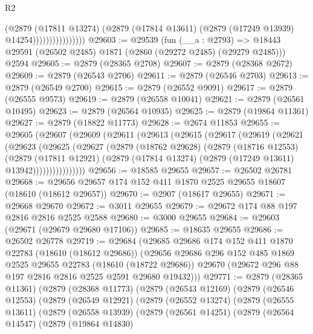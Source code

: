 \begin{lexlean}{R2}
\begin{coremodule}
                              (@2879
                                (@17811 @13274)
                                (@2879 (@17814 @13611) (@2879 (@17249 @13939) @14254))))))))))))))))
@29603 := @29539
    (fun (__a : @2793) => @18443 @29591 (@26502 @2485) @1871 (@2860 (@29272 @2485) (@29279 @2485)))
    @2594
@29605 := @2879 (@28365 @2708)
@29607 := @2879 (@28368 @2672)
@29609 := @2879 (@26543 @2706)
@29611 := @2879 (@26546 @2703)
@29613 := @2879 (@26549 @2700)
@29615 := @2879 (@26552 @9091)
@29617 := @2879 (@26555 @9573)
@29619 := @2879 (@26558 @10041)
@29621 := @2879 (@26561 @10495)
@29623 := @2879 (@26564 @10935)
@29625 := @2879 (@19864 @11361)
@29627 := @2879 (@18822 @11773)
@29628 := @2674 @11853
@29655 := @29605
    (@29607
      (@29609
        (@29611
          (@29613
            (@29615
              (@29617
                (@29619
                  (@29621
                    (@29623
                      (@29625
                        (@29627
                          (@2879
                            (@18762 @29628)
                            (@2879
                              (@18716 @12553)
                              (@2879
                                (@17811 @12921)
                                (@2879 (@17814 @13274) (@2879 (@17249 @13611) @13942))))))))))))))))
@29656 := @18585 @29655
@29657 := @26502 @26781
@29668 := @29656 @29657 @174 @152 @411 @1870 @2525 @29655 @18607 (@18610 (@18612 @29657))
@29670 := @2907 (@18617 @29655)
@29671 := @29668 @29670
@29672 := @3011 @29655
@29679 := @29672 @174 @88 @197 @2816 @2816 @2525 @2588
@29680 := @3000 @29655
@29684 := @29603 (@29671 (@29679 @29680 @17106))
@29685 := @18635 @29655
@29686 := @26502 @26778
@29719 := @29684
    (@29685
      @29686
      @174
      @152
      @411
      @1870
      @22783
      (@18610 (@18612 @29686))
      (@29656
        @29686
        @296
        @152
        @485
        @1869
        @2525
        @29655
        @22783
        (@18610 (@18722 @29686))
        @29670
        (@29672 @296 @88 @197 @2816 @2816 @2525 @2591 @29680 @19432)))
@29771 := @2879
    (@28365 @11361)
    (@2879
      (@28368 @11773)
      (@2879
        (@26543 @12169)
        (@2879
          (@26546 @12553)
          (@2879
            (@26549 @12921)
            (@2879
              (@26552 @13274)
              (@2879
                (@26555 @13611)
                (@2879
                  (@26558 @13939)
                  (@2879
                    (@26561 @14251)
                    (@2879
                      (@26564 @14547)
                      (@2879
                        (@19864 @14830)

\end{coremodule}
\end{lexlean}
